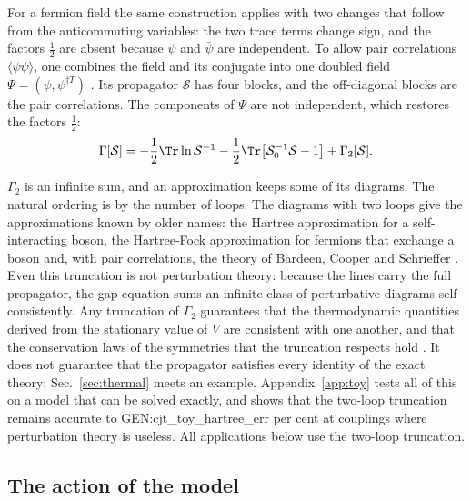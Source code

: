 For a fermion field the same construction applies with two changes that follow from the
anticommuting variables: the two trace terms change sign, and the factors $\tfrac12$ are absent
because $\psi$ and $\bar\psi$ are independent. To allow pair correlations $\langle\psi\psi\rangle$,
one combines the field and its conjugate into one doubled field $\Psi=(\psi,\psi^{\dagger T})$
\cite{Nambu1960,Gorkov1958}. Its propagator $\mathcal S$ has four blocks, and the off-diagonal blocks
are the pair correlations. The components of $\Psi$ are not independent, which restores the factors
$\tfrac12$:
\begin{equation}
\Gamma[\mathcal S]=-\frac12\Tr\ln\mathcal S^{-1}-\frac12\Tr\big[\mathcal S_0^{-1}\mathcal S-1\big]+\Gamma_2[\mathcal S].
\label{eq:CJTfermion}
\end{equation}

$\Gamma_2$ is an infinite sum, and an approximation keeps some of its diagrams. The natural ordering
is by the number of loops. The diagrams with two loops give the approximations known by older names:
the Hartree approximation for a self-interacting boson, the Hartree-Fock approximation for fermions
that exchange a boson and, with pair correlations, the theory of Bardeen, Cooper and Schrieffer
\cite{BCS1957}. Even this truncation is not perturbation theory: because the lines carry the full
propagator, the gap equation sums an infinite class of perturbative diagrams self-consistently. Any
truncation of $\Gamma_2$ guarantees that the thermodynamic quantities derived from the stationary
value of $V$ are consistent with one another, and that the conservation laws of the symmetries that
the truncation respects hold \cite{LuttingerWard1960,Baym1962}. It does not guarantee that the
propagator satisfies every identity of the exact theory; Sec.~\ref{sec:thermal} meets an example.
Appendix~\ref{app:toy} tests all of this on a model that can be solved exactly, and shows that the
two-loop truncation remains accurate to {{GEN:cjt_toy_hartree_err}} per cent at couplings where
perturbation theory is useless. All applications below use the two-loop truncation.

\subsection{The action of the model}
\label{sec:action}

